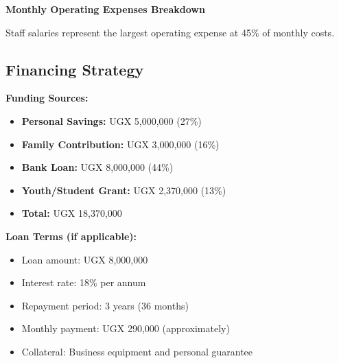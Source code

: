 \documentclass[a4paper,12pt]{article}
\begin{document}
\begin{center}
\textbf{Monthly Operating Expenses Breakdown}
\vspace{0.5em}


\vspace{0.5em}
Staff salaries represent the largest operating expense at 45\% of monthly costs.
\end{center}

\subsection{Financing Strategy}

\textbf{Funding Sources:}
\begin{itemize}[leftmargin=2em]
    \item \textbf{Personal Savings:} UGX 5,000,000 (27\%)
    \item \textbf{Family Contribution:} UGX 3,000,000 (16\%)
    \item \textbf{Bank Loan:} UGX 8,000,000 (44\%)
    \item \textbf{Youth/Student Grant:} UGX 2,370,000 (13\%)
    \item \textbf{Total:} UGX 18,370,000
\end{itemize}

\textbf{Loan Terms (if applicable):}
\begin{itemize}[leftmargin=2em]
    \item Loan amount: UGX 8,000,000
    \item Interest rate: 18\% per annum
    \item Repayment period: 3 years (36 months)
    \item Monthly payment: UGX 290,000 (approximately)
    \item Collateral: Business equipment and personal guarantee
\end{itemize}
\end{document}
